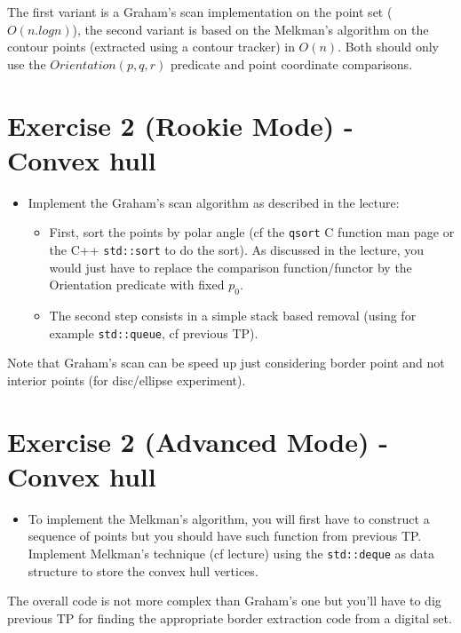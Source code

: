 \documentclass[a4paper, 11pt]{article}
\begin{document}
\par The first variant is a Graham's scan implementation on the point set ($O(n.logn)$), the second variant is based on the Melkman's algorithm on the contour points (extracted using a contour tracker) in $O(n)$. Both should only use the $Orientation(p,q,r)$ predicate and point coordinate comparisons.


\section*{Exercise 2 (Rookie Mode) - \rm Convex hull}

\begin{itemize}
	\item Implement the Graham's scan algorithm as described in the lecture:
		\begin{itemize}
		\item First, sort the points by polar angle (cf the \texttt{qsort} C function man page  or the C++ \texttt{std::sort} to do the sort). As discussed in the lecture, you would just have to replace the comparison function/functor by the Orientation predicate with fixed $p_0$.
		\item The second step consists in a simple stack based removal (using for example \texttt{std::queue}, cf previous TP).
		\end{itemize}
\end{itemize}

\par Note that Graham's scan can be speed up just considering border point and not interior points (for disc/ellipse experiment).


\section*{Exercise 2 (Advanced Mode) - \rm Convex hull}

\begin{itemize}
	\item To implement the Melkman's algorithm, you will first have to construct a sequence of points but you should have such function from previous TP. Implement Melkman's technique (cf lecture) using the \texttt{std::deque} as data structure to store the convex hull vertices. 
\end{itemize}

\par The overall code is not more complex than Graham's one but you'll have to dig previous TP for finding the appropriate border extraction code from a digital set.
\end{document}
